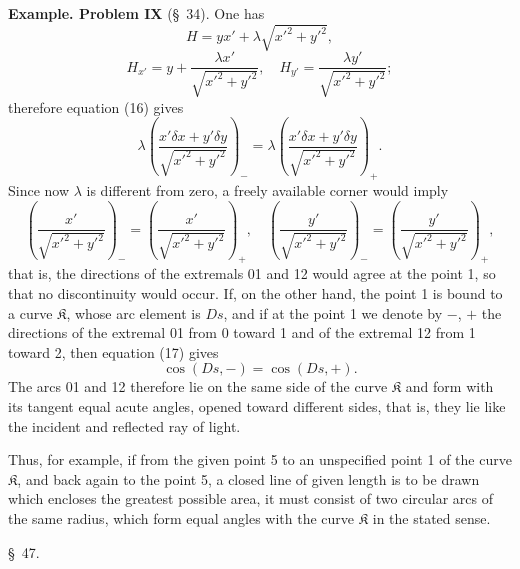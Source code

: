 \documentclass[11pt,a4paper,leqno]{article}
\begin{document}
\textbf{Example. Problem IX} (\S~34). One has
\[
H=yx' +\lambda\sqrt{x'^2+y'^2},
\]
\[
H_{x'}=y+\frac{\lambda x'}{\sqrt{x'^2+y'^2}},
\quad
H_{y'}=\frac{\lambda y'}{\sqrt{x'^2+y'^2}};
\]
therefore equation (16) gives
\begin{equation}\tag{17}
\lambda\left(\frac{x'\delta x+y'\delta y}{\sqrt{x'^2+y'^2}}\right)_-
=
\lambda\left(\frac{x'\delta x+y'\delta y}{\sqrt{x'^2+y'^2}}\right)_+.
\end{equation}
Since now $\lambda$ is different from zero, a freely available corner would imply
\[
\left(\frac{x'}{\sqrt{x'^2+y'^2}}\right)_-
=
\left(\frac{x'}{\sqrt{x'^2+y'^2}}\right)_+,
\quad
\left(\frac{y'}{\sqrt{x'^2+y'^2}}\right)_-
=
\left(\frac{y'}{\sqrt{x'^2+y'^2}}\right)_+,
\]
that is, the directions of the extremals 01 and 12 would agree at the point 1, so that no discontinuity would occur. If, on the other hand, the point 1 is bound to a curve $\mathfrak K$, whose arc element is $Ds$, and if at the point 1 we denote by $-$, $+$ the directions of the extremal 01 from 0 toward 1 and of the extremal 12 from 1 toward 2, then equation (17) gives
\[
\cos(Ds,-)=\cos(Ds,+).
\]
The arcs 01 and 12 therefore lie on the same side of the curve $\mathfrak K$ and form with its tangent equal acute angles, opened toward different sides, that is, they lie like the incident and reflected ray of light.

Thus, for example, if from the given point 5 to an unspecified point 1 of the curve $\mathfrak K$, and back again to the point 5, a closed line of given length is to be drawn which encloses the greatest possible area, it must consist of two circular arcs of the same radius, which form equal angles with the curve $\mathfrak K$ in the stated sense.

\begin{center}
{\large \S~47.}
\end{center}
\end{document}
